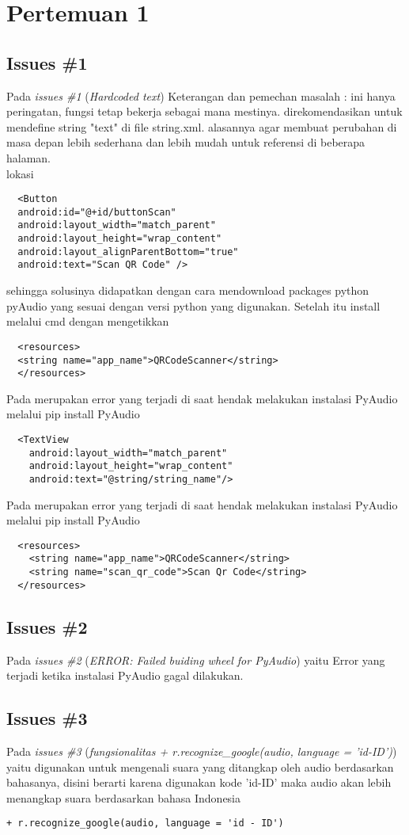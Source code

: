 \chapter{Pertemuan 1}

\section{Issues \#1}
Pada \textit{issues \#1} (\textit{Hardcoded text}) Keterangan dan pemechan masalah : ini hanya peringatan, fungsi tetap bekerja sebagai mana mestinya. direkomendasikan untuk mendefine string "text" di file string.xml. alasannya agar membuat perubahan di masa depan lebih sederhana dan lebih mudah untuk referensi di beberapa halaman.
\\lokasi
\begin{verbatim}
  <Button
  android:id="@+id/buttonScan"
  android:layout_width="match_parent"
  android:layout_height="wrap_content"
  android:layout_alignParentBottom="true"
  android:text="Scan QR Code" />       
\end{verbatim}
sehingga solusinya didapatkan dengan cara mendownload packages python pyAudio yang sesuai dengan versi python yang digunakan. Setelah itu install melalui cmd dengan mengetikkan \begin{verbatim}
  <resources>
  <string name="app_name">QRCodeScanner</string>
  </resources>
\end{verbatim}
Pada merupakan error yang terjadi di saat hendak melakukan instalasi PyAudio melalui pip install PyAudio\begin{verbatim}
  <TextView
    android:layout_width="match_parent"
    android:layout_height="wrap_content"
    android:text="@string/string_name"/>
\end{verbatim}
Pada merupakan error yang terjadi di saat hendak melakukan instalasi PyAudio melalui pip install PyAudio\begin{verbatim}
  <resources>
    <string name="app_name">QRCodeScanner</string>
    <string name="scan_qr_code">Scan Qr Code</string>
  </resources>
\end{verbatim}

\section{Issues \#2}
Pada \textit{issues \#2} (\textit{ERROR: Failed buiding wheel for PyAudio}) yaitu Error yang terjadi ketika instalasi PyAudio gagal dilakukan.

\section{Issues \#3}
Pada \textit{issues \#3} (\textit{fungsionalitas + r.recognize\_google(audio, language = 'id-ID')}) yaitu digunakan untuk mengenali suara yang ditangkap oleh audio berdasarkan bahasanya, disini berarti karena digunakan kode 'id-ID' maka audio akan lebih menangkap suara berdasarkan bahasa Indonesia
\begin{verbatim}
+ r.recognize_google(audio, language = 'id - ID')
\end{verbatim}

